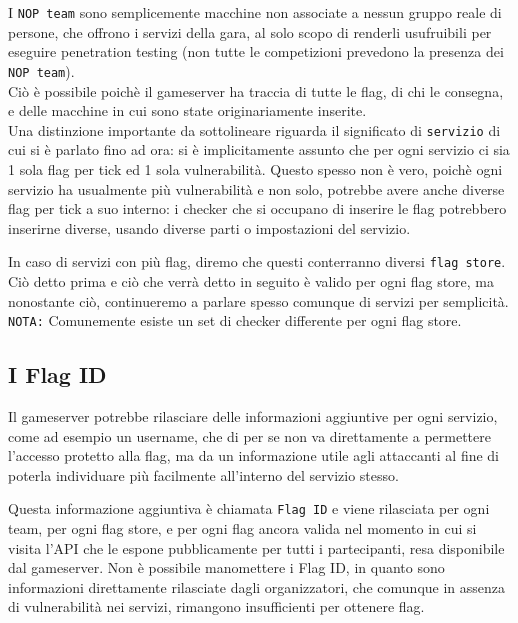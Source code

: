 I \texttt{NOP team} sono semplicemente macchine non associate a nessun gruppo reale di persone, che offrono i servizi della gara, al solo scopo di renderli usufruibili per eseguire penetration testing (non tutte le competizioni prevedono la presenza dei \texttt{NOP team}).\\

Ciò è possibile poichè il gameserver ha traccia di tutte le flag, di chi le consegna, e delle macchine in cui sono state originariamente inserite.\\

Una distinzione importante da sottolineare riguarda il significato di \texttt{servizio} di cui si è parlato fino ad ora: si è implicitamente assunto che per ogni servizio ci sia 1 sola flag per tick ed 1 sola vulnerabilità. Questo spesso non è vero, poichè ogni servizio ha usualmente più vulnerabilità e non solo, potrebbe avere anche diverse flag per tick a suo interno: i checker che si occupano di inserire le flag potrebbero inserirne diverse, usando diverse parti o impostazioni del servizio.

In caso di servizi con più flag, diremo che questi conterranno diversi \texttt{flag store}.\\

Ciò detto prima e ciò che verrà detto in seguito è valido per ogni flag store, ma nonostante ciò, continueremo a parlare spesso comunque di servizi per semplicità.\\

\texttt{NOTA:} Comunemente esiste un set di checker differente per ogni flag store.

\subsection{I Flag ID}

Il gameserver potrebbe rilasciare delle informazioni aggiuntive per ogni servizio, come ad esempio un username, che di per se non va direttamente a permettere l'accesso protetto alla flag, ma da un informazione utile agli attaccanti al fine di poterla individuare più facilmente all'interno del servizio stesso.

Questa informazione aggiuntiva è chiamata \texttt{Flag ID} e viene rilasciata per ogni team, per ogni flag store, e per ogni flag ancora valida nel momento in cui si visita l'API che le espone pubblicamente per tutti i partecipanti, resa disponibile dal gameserver. Non è possibile manomettere i Flag ID, in quanto sono informazioni direttamente rilasciate dagli organizzatori, che comunque in assenza di vulnerabilità nei servizi, rimangono insufficienti per ottenere flag.

